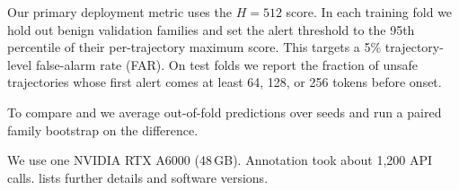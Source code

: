 Our primary deployment metric uses the $H{=}512$ score. In each training fold we hold out benign validation families and set the alert threshold to the 95th percentile of their per-trajectory maximum score. This targets a 5\% trajectory-level false-alarm rate (FAR). On test folds we report the fraction of unsafe trajectories whose first alert comes at least 64, 128, or 256 tokens before onset.

To compare \direct and \forecast we average out-of-fold predictions over seeds and run a paired family bootstrap on the \auroc difference.

We use one NVIDIA RTX A6000 (48\,GB). Annotation took about 1,200 API calls.  lists further details and software versions.
